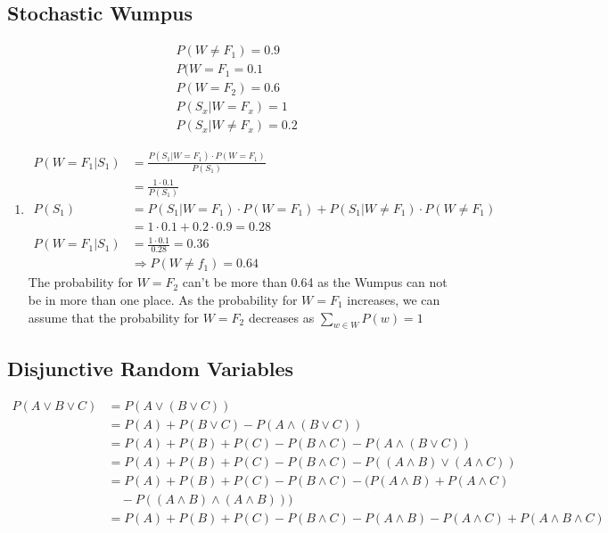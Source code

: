 \documentclass[fleqn,12pt]{scrartcl}
\begin{document}
\subsection{Stochastic Wumpus}
\begin{align*}
	&P(W\not =F_1) = 0.9\\
	&P(W = F_1 = 0.1\\
	&P(W = F_2) = 0.6\\
	&P(S_x | W = F_x) = 1\\
	&P(S_x | W \not = F_x) = 0.2
\end{align*}
\begin{enumerate}
	\item
		\begin{align*}
			P(W=F_1 | S_1) &= \frac{P(S_1 | W=F_1) \cdot P(W=F_1)}{P(S_1)}\\
									 &= \frac{1\cdot 0.1}{P(S_1)}\\
			P(S_1) &= P(S_1 | W=F_1) \cdot P(W=F_1) + P(S_1 | W \not = F_1) \cdot P(W \not = F_1)\\
						 &= 1\cdot 0.1 + 0.2 \cdot 0.9 = 0.28\\
			P(W= F_1| S_1) &= \frac{1\cdot 0.1}{0.28} = 0.36\\
														&\Rightarrow P(W \not = f_1) = 0.64
		\end{align*}
		The probability for $W=F_2$ can't be more than 0.64 as the Wumpus can not be in more than one place. As the probability for $W=F_1$ increases, we can assume that the probability for $W=F_2$ decreases as $\sum_{w\in W} P(w) = 1$
\end{enumerate}
\subsection{Disjunctive Random Variables}
\begin{align*}
	P(A \vee B \vee C) &= P(A \vee (B\vee C))\\
										 &=P(A) + P(B\vee C) - P(A \wedge (B\vee C))\\
	&= P(A) + P(B) + P(C) - P(B\wedge C) - P(A \wedge (B\vee C))\\
																	 &= P(A) + P(B) + P(C) - P(B\wedge C) - P((A \wedge B) \vee (A\wedge C))\\
																	 &= P(A) + P(B) + P(C) - P(B\wedge C) - (P(A\wedge B) + P(A\wedge C) \\ &\quad - P((A\wedge B) \wedge (A\wedge B)))\\
																	 &= P(A) + P(B) + P(C) - P(B\wedge C) - P(A\wedge B) - P(A\wedge C) + P(A\wedge B \wedge C)\\
\end{align*}
\end{document}

